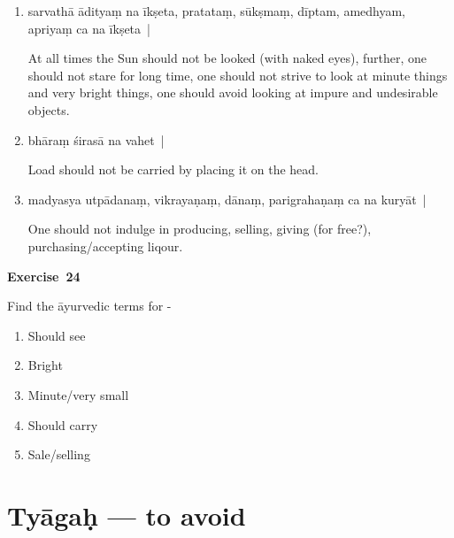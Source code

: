 \begin{enumerate}
\itemsep=0pt
\item {}

sarvathā ādityaṃ na īkṣeta, pratataṃ, sūkṣmaṃ, dīptam, amedhyam, apriyaṃ ca na īkṣeta~|  

At all times the Sun should not be looked (with naked eyes), further, one should not stare for long time, one should not strive to look at minute things and very bright things, one should avoid looking at impure and undesirable objects.  

\item {}

bhāraṃ śirasā na vahet~|

Load should not be carried by placing it on the head.  

\item {}

madyasya utpādanaṃ, vikrayaṇaṃ, dānaṃ, parigrahaṇaṃ ca na kuryāt~|   

One should not indulge in producing, selling, giving (for free?), purchasing/accepting liqour.
\end{enumerate}

\centerline{\textbf{Exercise~24}}

Find the āyurvedic terms for -
\begin{enumerate}
\itemsep=0pt
\renewcommand{\theenumi}{\alph{enumi}}
\renewcommand{\labelenumi}{\theenumi.}
\item Should see
\item Bright
\item Minute/very small
\item Should carry
\item Sale/selling
\end{enumerate}

\chapter{Tyāgaḥ --- to avoid}

